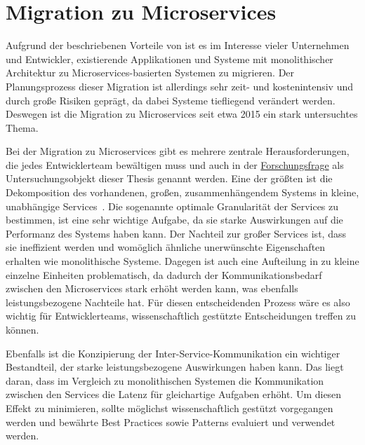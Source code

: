 \section{Migration zu Microservices}

Aufgrund der beschriebenen Vorteile von  ist es im Interesse vieler Unternehmen und Entwickler, existierende Applikationen und Systeme mit monolithischer Architektur zu Microservices-basierten Systemen zu migrieren.
Der Planungsprozess dieser Migration ist allerdings sehr zeit- und kostenintensiv und durch große Risiken geprägt, da dabei Systeme tiefliegend verändert werden.
Deswegen ist die Migration zu Microservices seit etwa 2015 ein stark untersuchtes Thema.

Bei der Migration zu Microservices gibt es mehrere zentrale Herausforderungen, die jedes Entwicklerteam bewältigen muss und auch in der \hyperref[forschungsfrage:1]{Forschungsfrage} als Untersuchungsobjekt dieser Thesis genannt werden.
Eine der größten ist die Dekomposition des vorhandenen, großen, zusammenhängendem Systems in kleine, unabhängige Services~\cite{a-survey-on,taibi2017processmotivations,taibi2019decomposition}.
Die sogenannte optimale Granularität der Services zu bestimmen, ist eine sehr wichtige Aufgabe, da sie starke Auswirkungen auf die Performanz des Systems haben kann.
Der Nachteil zur großer Services ist, dass sie ineffizient werden und womöglich ähnliche unerwünschte Eigenschaften erhalten wie monolithische Systeme.
Dagegen ist auch eine Aufteilung in zu kleine einzelne Einheiten problematisch, da dadurch der Kommunikationsbedarf zwischen den Microservices stark erhöht werden kann, was ebenfalls leistungsbezogene Nachteile hat.
Für diesen entscheidenden Prozess wäre es also wichtig für Entwicklerteams, wissenschaftlich gestützte Entscheidungen treffen zu können.

Ebenfalls ist die Konzipierung der Inter-Service-Kommunikation ein wichtiger Bestandteil, der starke leistungsbezogene Auswirkungen haben kann.
Das liegt daran, dass im Vergleich zu monolithischen Systemen die Kommunikation zwischen den Services die Latenz für gleichartige Aufgaben erhöht.
Um diesen Effekt zu minimieren, sollte möglichst wissenschaftlich gestützt vorgegangen werden und bewährte Best Practices sowie Patterns evaluiert und verwendet werden.


